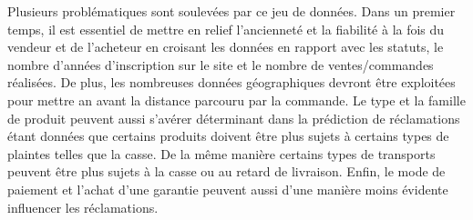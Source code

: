 Plusieurs problématiques sont soulevées par ce jeu de données. Dans un premier temps, 
il est essentiel de mettre en relief l'ancienneté et la fiabilité à la fois du vendeur et 
de l'acheteur en croisant les données en rapport avec les statuts, le nombre d'années 
d'inscription sur le site et le nombre de ventes/commandes réalisées. De plus, les 
nombreuses données géographiques devront être exploitées pour mettre an avant la distance
parcouru par la commande. Le type et la famille de produit peuvent aussi s'avérer déterminant
dans la prédiction de réclamations étant données que certains produits doivent être 
plus sujets à certains types de plaintes telles que la casse. De la même manière certains
types de transports peuvent être plus sujets à la casse ou au retard de livraison. 
Enfin, le mode de paiement et l'achat d'une garantie peuvent aussi d'une manière moins
évidente influencer les réclamations.



